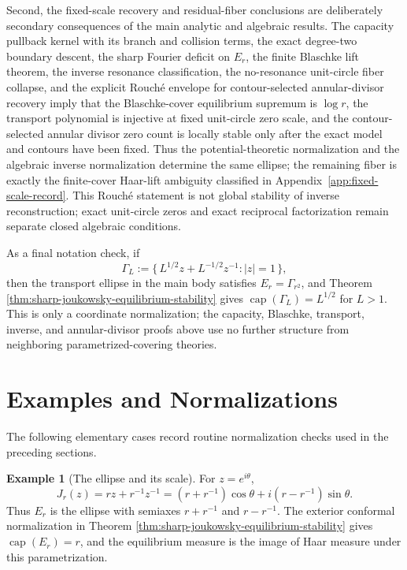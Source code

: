 \documentclass[12pt,a4paper]{article}
\theoremstyle{plain}
\theoremstyle{definition}
\newtheorem{example}[theorem]{Example}
\numberwithin{equation}{section}
\begin{document}
Second, the fixed-scale recovery and residual-fiber conclusions are deliberately secondary consequences of the main analytic and algebraic results.  The capacity pullback kernel with its branch and collision terms, the exact degree-two boundary descent, the sharp Fourier deficit on \(E_r\), the finite Blaschke lift theorem, the inverse resonance classification, the no-resonance unit-circle fiber collapse, and the explicit Rouch\'e envelope for contour-selected annular-divisor recovery imply that the Blaschke-cover equilibrium supremum is \(\log r\), the transport polynomial is injective at fixed unit-circle zero scale, and the contour-selected annular divisor zero count is locally stable only after the exact model and contours have been fixed.  Thus the potential-theoretic normalization and the algebraic inverse normalization determine the same ellipse; the remaining fiber is exactly the finite-cover Haar-lift ambiguity classified in Appendix~\ref{app:fixed-scale-record}.  This Rouch\'e statement is not global stability of inverse reconstruction; exact unit-circle zeros and exact reciprocal factorization remain separate closed algebraic conditions.

As a final notation check, if
\[
\Gamma_L:=\bigl\{\,L^{1/2}z+L^{-1/2}z^{-1}:|z|=1\,\bigr\},
\]
then the transport ellipse in the main body satisfies \(E_r=\Gamma_{r^2}\), and Theorem \ref{thm:sharp-joukowsky-equilibrium-stability} gives \(\operatorname{cap}(\Gamma_L)=L^{1/2}\) for \(L>1\).  This is only a coordinate normalization; the capacity, Blaschke, transport, inverse, and annular-divisor proofs above use no further structure from neighboring parametrized-covering theories.

\appendix

\section{Examples and Normalizations}\label{sec:examples}

The following elementary cases record routine normalization checks used
in the preceding sections.

\begin{example}[The ellipse and its scale]\label{ex:joukowsky-ellipse-scale}
For \(z=e^{i\theta}\),
\[
J_r(z)=rz+r^{-1}z^{-1}=(r+r^{-1})\cos\theta+i(r-r^{-1})\sin\theta.
\]
Thus \(E_r\) is the ellipse with semiaxes \(r+r^{-1}\) and \(r-r^{-1}\).  The exterior conformal normalization in Theorem \ref{thm:sharp-joukowsky-equilibrium-stability} gives \(\operatorname{cap}(E_r)=r\), and the equilibrium measure is the image of Haar measure under this parametrization.
\end{example}
\end{document}
